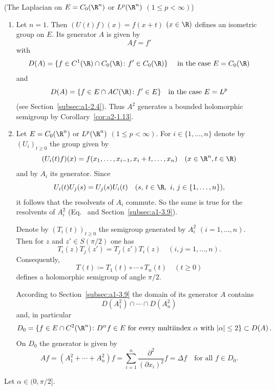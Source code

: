 \begin{example*}\label{ex:a2-1.13-kgk}(The Laplacian on $E = C_{0}(\R^{n})$ or $L^{p}(\R^{n})$ $(1 \leq p < \infty)$) 
\begin{enumerate}[\upshape (i), wide, labelindent=.25em]
\item \label{ex:a2-1.13-kgk-1}
Let $n = 1$.
Then $(U(t)f)(x) = f(x+t)$ $(x \in \R)$ defines an isometric group on $E$.
Its generator $A$ is given by 
\[
Af = f'
\]  
with
\[
D(A) = \{f \in C^{1}(\R) \cap C_{0}(\R) \colon f' \in C_{0}(\R)\}
\quad \text{ in the case } E = C_{0}(\R)
\]
and
\[
D(A) = \{f \in E \cap AC(\R) \colon f' \in E\} \quad \text{in the case } E = L^{p}
\] 
(see Section~\ref{subsec:a1-2.4}).
Thus $A^{2}$ generates a bounded holomorphic semigroup by Corollary~\ref{cor:a2-1.13}. 
\item \label{ex:a2-1.13-kgk-2}
Let $E = C_{0}(\R^{n})$ or $L^{p}(\R^{n})$ $(1 \leq p < \infty)$.
For $i \in \{1,\ldots,n\}$ denote by $(U_{i})_{t \geq 0}$ the group given by 
\[
(U_{i}(t)f)(x) = f(x_{1},\ldots,x_{i-1},x_{i}+t,\ldots,x_{n}) \quad  (x \in \R^{n}, t \in \R)
\]
and by $A_{i}$ its generator.
Since 
\[ U_{i}(t)U_{j}(s) = U_{j}(s)U_{i}(t) \quad (s,\,t \in \R,\ i,\,j \in \{1, \ldots, n \}), 
\]
it follows that the resolvents of\/ $A_{i}$ commute.
So the same is true for the resolvents of\/ $A_{i}^{2}$ (\cf Eq.~ and 
Section~\ref{subsec:a1-3.9}). 

Denote by $(T_{i}(t))_{t \geq 0}$ 
the semigroup generated by $A_{i}^{2}$ $(i=1,\ldots,n)$.
Then for $z$ and $z' \in S(\pi/2)$ one has 
%
\[
	T_{i}(z)T_{j}(z') = T_{j}(z')T_{i}(z) \quad (i,j=1,\ldots,n) .
\]
%
Consequently, 
%
\[
	T(t) \coloneqq T_{1}(t) \circ \cdots \circ T_{n}(t) \quad (t \geq 0)
\]
%
defines a holomorphic semigroup of angle $\pi/2$.

According to Section~\ref{subsec:a1-3.9} the domain of its generator $A$ contains 
%
\[
	D(A_{1}^{2}) \cap \cdots \cap D(A_{n}^{2})
\]
%
and, in particular
\[
D_{0} = \{f \in E \cap C^{2}(\R^{n}) \colon D^{\alpha}f \in E \text{ for every multiindex } \alpha \text{ with } |\alpha| \leq 2\} \subset D(A)\,.
\]
On $D_{0}$ the generator is given by
\[
    Af = (A_{1}^{2} + \cdots + A_{n}^{2})f =
    \sum_{i = 1}^{n} \frac{\partial^{2}}{(\partial x_{i})^{2}} f
    = \Delta f \quad \text{for all $f \in D_{0}$.} 
\]
\end{enumerate}
\end{example*}
Let $\alpha \in (0,\pi/2]$.
